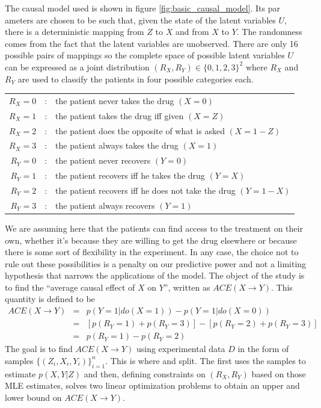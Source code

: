 \documentclass[a4paper, 10pt]{article}
\begin{document}

The causal model used is shown in figure \ref{fig:basic_causal_model}. Its par
ameters are chosen to be such that, given the state of the latent variables
$U$, there is a deterministic mapping from $Z$ to $X$ and from $X$ to $Y$. The
randomness comes from the fact that the latent variables are unobserved. There
are only 16 possible pairs of
mappings so the complete space of possible latent
variables $U$ can be expressed as a joint distribution
$(R_X, R_Y)
\in \{0,1,2,3\}^2$ where $R_X$ and $R_Y$ are used to classify the patients in
four possible categories each.

\begin{tabular}{rcl}
	$R_X=0$ & : &  the patient never takes the drug $(X=0)$ \\
	$R_X=1$ & : &  the patient takes the drug iff given $(X=Z)$ \\
	$R_X=2$ & : &  the patient does the opposite of what is asked
$(X=1-Z)$
\\
	$R_X=3$ & : &  the patient always takes the drug $(X=1)$ \\
	$R_Y=0$ & : &  the patient never recovers $(Y=0)$\\
	$R_Y=1$ & : &  the patient recovers iff he takes the drug $(Y=X)$\\
	$R_Y=2$ & : &  the patient recovers iff he does not take the drug
$(Y=1-X)$\\
	$R_Y=3$ & : &  the patient always recovers $(Y=1)$
\end{tabular}


We are assuming here that the patients can find access to the treatment on
their own, whether it's because they are willing to get the drug elsewhere
or because there is some sort of flexibility in the experiment. In any
case, the choice not to rule out these possibilities is a penalty on our
predictive power and not a limiting hypothesis that narrows the applications of
the model. The object of the study is to find the ``average causal effect of
$X$ on $Y$'', written as $ACE(X\rightarrow Y)$. This quantity is defined to be
\begin{eqnarray*}
ACE(X\rightarrow Y) & = & p(Y=1|do(X=1)) - p(Y=1|do(X=0)) \\
		    & = & \left[p(R_Y=1) + p(R_Y=3)\right] - \left[p(R_Y=2) +
p(R_Y=3)\right] \\
		    & = & p(R_Y=1) - p(R_Y=2)
\end{eqnarray*}
The goal is to find $ACE(X\rightarrow Y)$ using experimental data $D$ in the
form of samples $\{(Z_i, X_i, Y_i)\}_{i=1}^n$. This is where
\cite{pearl2000cmr} and
\cite{chickering1997cst} split. The first uses
the samples to estimate $p(X,Y|Z)$ and then, defining constraints on $(R_X,
R_Y)$ based on those MLE estimates, solves two linear optimization problems to
obtain an upper and lower bound on $ACE(X\rightarrow Y)$.
\end{document}

